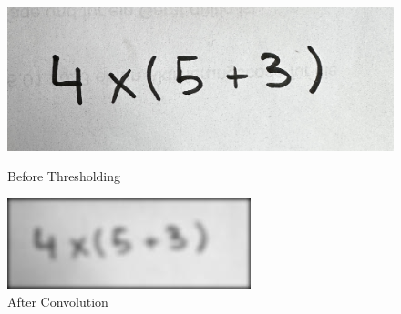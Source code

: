 \documentclass[@CLASSOPTIONS@]{tumarticle}
\begin{document}
\begin{figure}[!htb]
    \vspace{0.3cm}
   \begin{minipage}{0.48\textwidth}
     \centering
     \includegraphics[width=.7\linewidth]{figures/real_data_1}
     \caption{Before Thresholding}\label{Fig:Data3}
   \end{minipage}\hfill
   \vspace{0.3cm}
   \begin{minipage}{0.48\textwidth}
     \centering
     \includegraphics[width=.7\linewidth]{figures/convolve}
     \caption{After Convolution}\label{Fig:Data4_1}
   \end{minipage}
      \vspace{0.3cm}


\end{figure}
\end{document}
